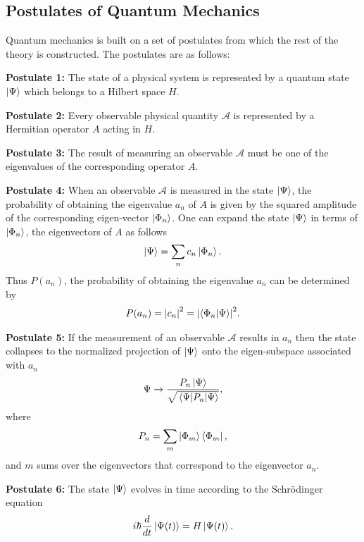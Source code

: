\documentclass[Dual]{msu-thesis}
\begin{document}
\subsection{Postulates of Quantum Mechanics}

Quantum mechanics is built on a set of postulates from which the rest of the theory is constructed. The postulates are as follows:

\textbf{Postulate 1:} The state of a physical system is represented by a quantum state $\ket{\Psi}$ which belongs to a Hilbert space $H$. 

\textbf{Postulate 2:} Every observable physical quantity $\mathcal{A}$ is represented by a Hermitian operator $A$ acting in $H$.

\textbf{Postulate 3:} The result of measuring an observable $\mathcal{A}$ must be one of the eigenvalues of the corresponding operator $A$.

\textbf{Postulate 4:} When an observable $\mathcal{A}$ is measured in the state $\ket{\Psi}$, the probability of obtaining the eigenvalue $a_n$ of $A$ is given by the squared amplitude of the corresponding eigen-vector $\ket{\Phi_n}$. One can expand the state $\ket{\Psi}$ in terms of $\ket{\Phi_n}$, the eigenvectors of $A$ as follows
\begin{align}
\ket{\Psi}=\sum_{n}c_n\ket{\Phi_n}.
\end{align}
Thus $P(a_n)$, the probability of obtaining the eigenvalue $a_n$ can be determined by
\begin{align}
P(a_n)=\abs{c_n}^2=\abs{\bra{\Phi_n}\ket{\Psi}}^2.
\end{align}

\textbf{Postulate 5:} If the measurement of an observable $\mathcal{A}$ results in $a_n$ then the state collapses to the normalized projection of $\ket{\Psi}$ onto the eigen-subspace associated with $a_n$
\begin{align}
\Psi \to \frac{P_n\ket{\Psi}}{\sqrt{\mel{\Psi}{P_n}{\Psi}}},
\end{align}
where
\begin{align}
P_n=\sum_{m}\ket{\Phi_m}\bra{\Phi_m},
\end{align}
and $m$ sums over the eigenvectors that correspond to the eigenvector $a_n$.

\textbf{Postulate 6:} 
The state $\ket{\Psi}$ evolves in time according to the Schr\"{o}dinger equation
\begin{align}
\label{postulate_6}
i\hbar\frac{d}{dt}\ket{\Psi(t)}=H\ket{\Psi(t)}.
\end{align}
\end{document}
